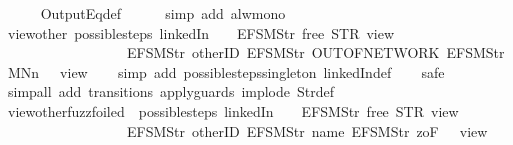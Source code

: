 \begin{isabellebody}
\ \ \ \ \isamarkupfalse%
\ OutputEq{\isacharunderscore}def\isanewline
\ \ \ \ \isamarkupfalse%
\ {\isacharparenleft}simp\ add{\isacharcolon}\ alw{\isacharunderscore}mono{\isacharparenright}\isanewline
\ \ \isamarkupfalse%
\isanewline
{}\isamarkupfalse%
%
\endisatagproof
{\isafoldproof}%
%
\isadelimproof
\isanewline
%
\endisadelimproof
\isanewline
{}\isamarkupfalse%
\ view{\isacharunderscore}other{\isacharcolon}\ {\isachardoublequoteopen}possible{\isacharunderscore}steps\ linkedIn\ {}\ {\isacharless}{}\ {\isacharcolon}{\isacharequal}\ EFSM{\isachardot}Str\ {\isacharprime}{\isacharprime}free{\isacharprime}{\isacharprime}{\isachargreater}\ STR\ {\isacharprime}{\isacharprime}view{\isacharprime}{\isacharprime}\isanewline
\ \ \ \ \ \ \ \ \ \ \ \ \ \ \ \ \ \ {\isacharbrackleft}EFSM{\isachardot}Str\ {\isacharprime}{\isacharprime}otherID{\isacharprime}{\isacharprime}{\isacharcomma}\ EFSM{\isachardot}Str\ {\isacharprime}{\isacharprime}OUT{\isacharunderscore}OF{\isacharunderscore}NETWORK{\isacharprime}{\isacharprime}{\isacharcomma}\ EFSM{\isachardot}Str\ {\isacharprime}{\isacharprime}MNn{}{\isacharprime}{\isacharprime}{\isacharbrackright}\ {\isacharequal}\ {\isacharbraceleft}{\isacharbar}{\isacharparenleft}{}{\isacharcomma}\ view{}{\isacharparenright}{\isacharbar}{\isacharbraceright}{\isachardoublequoteclose}\isanewline
%
\isadelimproof
\ \ %
\endisadelimproof
%
\isatagproof
{}\isamarkupfalse%
\ {\isacharparenleft}simp\ add{\isacharcolon}\ possible{\isacharunderscore}steps{\isacharunderscore}singleton\ linkedIn{\isacharunderscore}def{\isacharparenright}\isanewline
\ \ \isamarkupfalse%
\ safe\isanewline
\ \ \isamarkupfalse%
\ {\isacharparenleft}simp{\isacharunderscore}all\ add{\isacharcolon}\ transitions\ apply{\isacharunderscore}guards\ implode\ Str{\isacharunderscore}def{\isacharparenright}%
\endisatagproof
{\isafoldproof}%
%
\isadelimproof
\isanewline
%
\endisadelimproof
\isanewline
{}\isamarkupfalse%
\ view{\isacharunderscore}other{\isacharunderscore}fuzz{\isacharunderscore}foiled{\isacharcolon}\ {\isachardoublequoteopen}\ possible{\isacharunderscore}steps\ linkedIn\ {}\ {\isacharless}{}\ {\isacharcolon}{\isacharequal}\ EFSM{\isachardot}Str\ {\isacharprime}{\isacharprime}free{\isacharprime}{\isacharprime}{\isachargreater}\ STR\ {\isacharprime}{\isacharprime}view{\isacharprime}{\isacharprime}\isanewline
\ \ \ \ \ \ \ \ \ \ \ \ \ \ \ \ \ \ {\isacharbrackleft}EFSM{\isachardot}Str\ {\isacharprime}{\isacharprime}otherID{\isacharprime}{\isacharprime}{\isacharcomma}\ EFSM{\isachardot}Str\ {\isacharprime}{\isacharprime}name{\isacharprime}{\isacharprime}{\isacharcomma}\ EFSM{\isachardot}Str\ {\isacharprime}{\isacharprime}{}zoF{\isacharprime}{\isacharprime}{\isacharbrackright}\ {\isacharequal}\ {\isacharbraceleft}{\isacharbar}{\isacharparenleft}{}{\isacharcomma}\ view{}{\isacharparenright}{\isacharbar}{\isacharbraceright}{\isachardoublequoteclose}\isanewline

\end{isabellebody}
